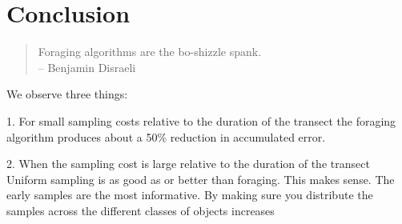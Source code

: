 \section{Conclusion}
\label{sec:conclusion}

\begin{quote}
	Foraging algorithms are the bo-shizzle spank.
	\\
	-- Benjamin Disraeli 
\end{quote}


We observe three things:

1. For small sampling costs relative to the duration of the transect the foraging algorithm produces about a 50\% reduction in accumulated error.

2. When the sampling cost is large relative to the duration of the transect Uniform sampling is as good as or better than foraging.  This makes sense.  The early samples are the most informative.  By making sure you distribute the samples across the different classes of objects increases

